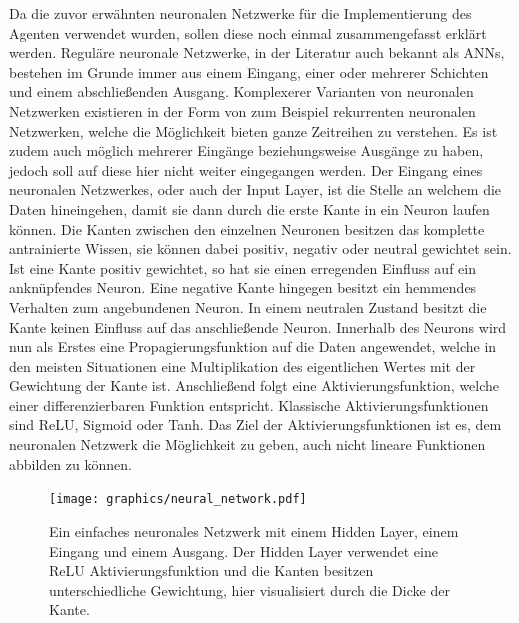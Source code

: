 \documentclass[]{iat}
\begin{document}
Da die zuvor erwähnten neuronalen Netzwerke für die Implementierung des Agenten verwendet wurden, sollen diese noch einmal zusammengefasst erklärt werden. Reguläre neuronale Netzwerke, in der Literatur auch bekannt als ANNs, bestehen im Grunde immer aus einem Eingang, einer oder mehrerer Schichten und einem abschließenden Ausgang. Komplexerer Varianten von neuronalen Netzwerken existieren in der Form von zum Beispiel rekurrenten neuronalen Netzwerken, welche die Möglichkeit bieten ganze Zeitreihen zu verstehen. Es ist zudem auch möglich mehrerer Eingänge beziehungsweise Ausgänge zu haben, jedoch soll auf diese hier nicht weiter eingegangen werden. Der Eingang eines neuronalen Netzwerkes, oder auch der Input Layer, ist die Stelle an welchem die Daten hineingehen, damit sie dann durch die erste Kante in ein Neuron laufen können. Die Kanten zwischen den einzelnen Neuronen besitzen das komplette antrainierte Wissen, sie können dabei positiv, negativ oder neutral gewichtet sein. Ist eine Kante positiv gewichtet, so hat sie einen erregenden Einfluss auf ein anknüpfendes Neuron. Eine negative Kante hingegen besitzt ein hemmendes Verhalten zum angebundenen Neuron. In einem neutralen Zustand besitzt die Kante keinen Einfluss auf das anschließende Neuron. Innerhalb des Neurons wird nun als Erstes eine Propagierungsfunktion auf die Daten angewendet, welche in den meisten Situationen eine Multiplikation des eigentlichen Wertes mit der Gewichtung der Kante ist. Anschließend folgt eine Aktivierungsfunktion, welche einer differenzierbaren Funktion entspricht. Klassische Aktivierungsfunktionen sind ReLU, Sigmoid oder Tanh. Das Ziel der Aktivierungsfunktionen ist es, dem neuronalen Netzwerk die Möglichkeit zu geben, auch nicht lineare Funktionen abbilden zu können. \cite[]{KrusComp2015}
\begin{figure}[H]
    \texttt{[image: graphics/neural\_network.pdf]}
    \centering
    \caption{Ein einfaches neuronales Netzwerk mit einem Hidden Layer, einem Eingang und einem Ausgang. Der Hidden Layer verwendet eine ReLU Aktivierungsfunktion und die Kanten besitzen unterschiedliche Gewichtung, hier visualisiert durch die Dicke der Kante.}
    \label{abb:nn}
\end{figure}
\end{document}
